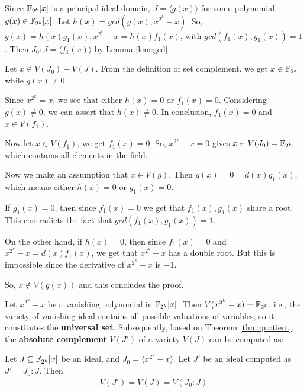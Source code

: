 \begin{Proof}
Since ${\mathbb{F}}_{2^k}[x]$ is a principal ideal domain, $ J = \langle g(x)\rangle$
for some polynomial $ g(x) \in {\mathbb{F}}_{2^k}[x]$. Let $h(x) = gcd(g(x), x^{2^k} -
x)$. So, $g(x) = h(x)g_1(x) , x^{2^k} - x = h(x)f_1(x)$, with $gcd(f_1(x) , g_1(x) ) =
1$. Then $J_0 : J = \langle f_1(x) \rangle$ by Lemma \ref{lem:gcd}. 

Let $x \in V(J_0 ) - V(J)$. From the definition of set
complement, we get $x \in {\mathbb{F}}_{2^k}$ while $g(x) \neq 0$.  

Since $x^{2^k} = x$, we see that either $h(x) = 0$ or $f_1 (x) =
0$. Considering $g(x) \neq 0$, we can assert that $h(x) \neq 0$. In
conclusion, $f_1 (x) = 0$ and $x \in V(f_1 )$. 

Now let $x \in V(f_1 )$, we get $f_1 (x) = 0$. So, $x^{2^k} - x = 0$
gives $x \in V(J_0) = {\mathbb{F}}_{2^k}$ which  contains all elements in the
field. 

Now we make an assumption that $x \in V(g)$. Then $g(x) = 0 =
d(x)g_1(x)$, which means either $h(x) = 0$ or $g_1 (x) = 0$. 

If $g_1 (x) = 0$, then since $f_1 (x) = 0$ we get that $f_1(x) , g_1(x)$
share a root. This contradicts the fact that $gcd(f_1(x) , g_1(x) ) = 1$.

On the other hand, if $h(x) = 0$, then since $f_1 (x) = 0$ and
$x^{2^k} - x = d(x)f_1(x)$, we get that $x^{2^k} - x$ has a double root. 
But this is impossible since the derivative of $x^{2^k} - x$ is $-1$.

So, $x \notin V(g(x))$ and this concludes the proof.
\end{Proof}


Let $x^{2^k}-x$ be a vanishing polynomial in ${\mathbb{F}}_{2^k}[x]$. Then $V(x^{2^k}-x)={\mathbb{F}}_{2^k}$,
i.e., the variety of vanishing ideal contains
 all possible valuations of variables, so it constitutes the {\bf
   universal set}. Subsequently, based on Theorem \ref{thm:quotient},
 the {\bf absolute complement} $V(J')$ of a variety $V(J)$ can be
 computed as: 

\begin{Corollary} \label{cor:complement}
Let $J\subseteq {\mathbb{F}}_{2^k}[x]$ be an ideal, and $J_0=\langle x^{2^k}-x\rangle$. Let $J'$ be an ideal 
computed as $J' = J_0:J$. Then $$V(J') = \overline{V(J)} = {V}(J_0:J)$$
\end{Corollary}

